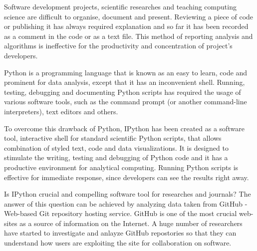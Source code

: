 Software development projects, scientific researches and teaching computing science are difficult to organise, document and present. Reviewing a piece of code or publishing it has always required explanation and so far it has been recorded as a comment in the code or as a text file. This method of reporting analysis and algorithms is ineffective for the productivity and concentration of project's developers. 

Python is a programming language that is known as an easy to learn, code and prominent for data analysis, except that it has an inconvenient shell. Running, testing, debugging and documenting Python scripts has required the usage of various software tools, such as the command prompt (or another command-line interpreters), text editors and others. 

To overcome this drawback of Python, IPython has been created as a software tool, interactive shell for standard scientific Python scripts, that allows combination of styled text, code and data visualizations. It is designed to stimulate the writing, testing and debugging of Python code and it has a productive environment for analytical computing. \cite{mckinney2012python} Running Python scripts is effective for immediate response, since developers can see the results right away.

Is IPython crucial and compelling software tool for researches and journals? The answer of this question can be achieved by analyzing data taken from GitHub - Web-based Git repository hosting service. \cite{gitHubWiki} GitHub is one of the most crucial web-sites as a source of information  on the Internet. A huge number of researchers have started to investigate and anlayze GitHub repostories so that they can understand how users are exploiting the site for collaboration on software. \cite{kalliamvakou2007promises}